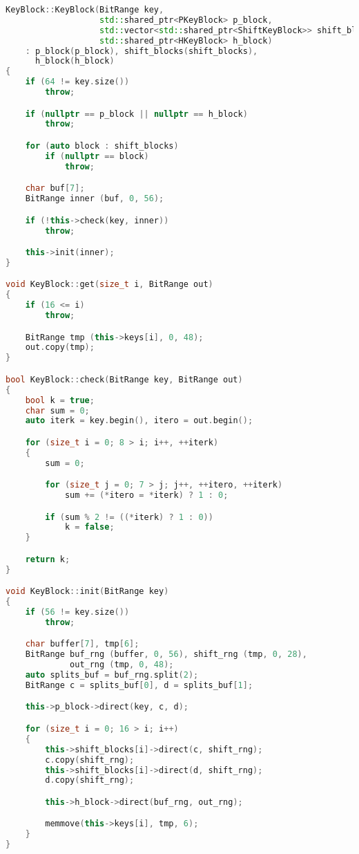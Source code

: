 \begin{lstlisting}[language=c++, caption={Класс, реализующий получение ключа}]
KeyBlock::KeyBlock(BitRange key,
                   std::shared_ptr<PKeyBlock> p_block,
                   std::vector<std::shared_ptr<ShiftKeyBlock>> shift_blocks,
                   std::shared_ptr<HKeyBlock> h_block)
    : p_block(p_block), shift_blocks(shift_blocks),
      h_block(h_block)
{
    if (64 != key.size())
        throw;

    if (nullptr == p_block || nullptr == h_block)
        throw;

    for (auto block : shift_blocks)
        if (nullptr == block)
            throw;

    char buf[7];
    BitRange inner (buf, 0, 56);

    if (!this->check(key, inner))
        throw;

    this->init(inner);
}

void KeyBlock::get(size_t i, BitRange out)
{
    if (16 <= i)
        throw;

    BitRange tmp (this->keys[i], 0, 48);
    out.copy(tmp);
}

bool KeyBlock::check(BitRange key, BitRange out)
{
    bool k = true;
    char sum = 0;
    auto iterk = key.begin(), itero = out.begin();

    for (size_t i = 0; 8 > i; i++, ++iterk)
    {
        sum = 0;

        for (size_t j = 0; 7 > j; j++, ++itero, ++iterk)
            sum += (*itero = *iterk) ? 1 : 0;

        if (sum % 2 != ((*iterk) ? 1 : 0))
            k = false;
    }

    return k;
}

void KeyBlock::init(BitRange key)
{
    if (56 != key.size())
        throw;

    char buffer[7], tmp[6];
    BitRange buf_rng (buffer, 0, 56), shift_rng (tmp, 0, 28),
             out_rng (tmp, 0, 48);
    auto splits_buf = buf_rng.split(2);
    BitRange c = splits_buf[0], d = splits_buf[1];

    this->p_block->direct(key, c, d);

    for (size_t i = 0; 16 > i; i++)
    {
        this->shift_blocks[i]->direct(c, shift_rng);
        c.copy(shift_rng);
        this->shift_blocks[i]->direct(d, shift_rng);
        d.copy(shift_rng);

        this->h_block->direct(buf_rng, out_rng);

        memmove(this->keys[i], tmp, 6);
    }
}


\end{lstlisting}
